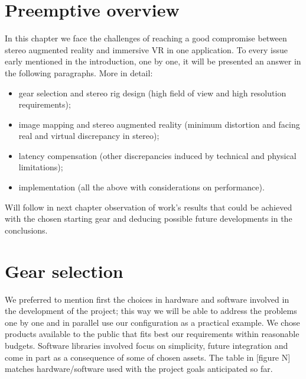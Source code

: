 
\section{Preemptive overview}
In this chapter we face the challenges of reaching a good compromise between stereo augmented reality and immersive VR in one application. To every issue early mentioned in the introduction, one by one, it will be presented an answer in the following paragraphs. More in detail:
\begin{itemize}
\item gear selection and stereo rig design (high field of view and high resolution requirements);
\item image mapping and stereo augmented reality (minimum distortion and facing real and virtual discrepancy in stereo);
\item latency compensation (other discrepancies induced by technical and physical limitations);
\item implementation (all the above with considerations on performance).
\end{itemize}
Will follow in next chapter observation of work's results that could be achieved with the chosen starting gear and deducing possible future developments in the conclusions.

\section{Gear selection}
We preferred to mention first the choices in hardware and software involved in the development of the project; this way we will be able to address the problems one by one and in parallel use our configuration as a practical example. We chose products available to the public that fits best our requirements within reasonable budgets. Software libraries involved focus on simplicity, future integration and come in part as a consequence of some of chosen assets. The table in [figure N] matches hardware/software used with the project goals anticipated so far.

